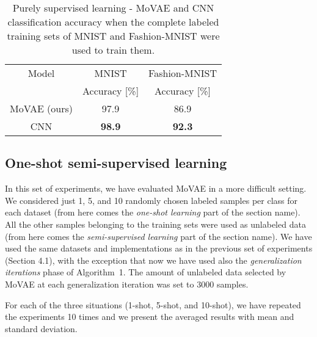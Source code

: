 \documentclass[sigconf,authorversion=true]{aamas}  %
\begin{document}
\begin{table}[b!]
\caption{Purely supervised learning - MoVAE and CNN classification accuracy when the complete labeled training sets of MNIST and Fashion-MNIST were used to train them.}
\tabcolsep=0.06cm
\footnotesize
\begin{tabular}{|c|c|c|}
\hline
Model&MNIST&Fashion-MNIST\\
&Accuracy [\%]&Accuracy [\%]\\
\cline{1-3}
\hline
\hline
MoVAE (ours)&97.9&86.9\\
CNN&\textbf{98.9}&\textbf{92.3}\\
\hline
\end{tabular}
\label{tab:alltraining}
\end{table}\subsection{One-shot semi-supervised learning}

In this set of experiments, we have evaluated MoVAE in a more difficult setting. We considered just 1, 5, and 10 randomly chosen labeled samples per class for each dataset (from here comes the \textit{one-shot learning} part of the section name). All the other samples belonging to the training sets were used as unlabeled data (from here comes the \textit{semi-supervised learning} part of the section name). We have used the same datasets and implementations as in the previous set of experiments (Section 4.1), with the exception that now we have used also the \textit{generalization iterations} phase of Algorithm~1. The amount of unlabeled data selected by MoVAE at each generalization iteration was set to 3000 samples.

For each of the three situations (1-shot, 5-shot, and 10-shot), we have repeated the experiments 10 times and we present the averaged results with mean and standard deviation.
\end{document}
